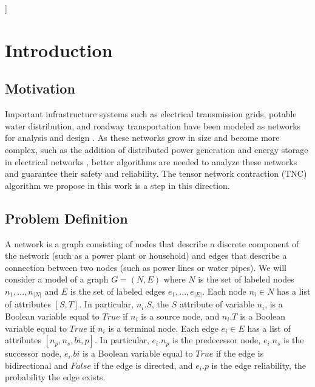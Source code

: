 \documentclass[12pt,twocolumn]{article}
\newcommand{\seven}{\fontsize{7pt}{\baselineskip}\selectfont}    %
\begin{document}
\vspace*{20pt}
]



\BeforeBeginEnvironment{tabularx}{\begin{center}\seven}

\addtolength{\textfloatsep}{-0.2in}
\hypertarget{introduction}{%
\section{Introduction}\label{introduction}}

\hypertarget{motivation}{%
\subsection{Motivation}\label{motivation}}

Important infrastructure systems such as electrical transmission grids, potable water distribution, and roadway transportation have been modeled as networks for analysis and design \cite{levy1967monte} \cite{cotilla2012comparing}. As these networks grow in size and become more complex, such as the addition of distributed power generation and energy storage in electrical networks \cite{escalera2018survey}, better algorithms are needed to analyze these networks and guarantee their safety and reliability. The tensor network contraction (TNC) algorithm we propose in this work is a step in this direction.

\hypertarget{problem-definition}{%
\subsection{Problem Definition}\label{problem-definition}}

A network is a graph consisting of nodes that describe a discrete component of the network (such as a power plant or household) and edges that describe a connection between two nodes (such as power lines or water pipes). We will consider a model of a graph \(G = (N,E)\) where \(N\) is the set of labeled nodes \(n_1,...,n_{|N|}\) and \(E\) is the set of labeled edges \(e_1,...,e_{|E|}\). Each node \(n_i \in N\) has a list of attributes \([S,T]\). In particular, \(n_i.S\), the \(S\) attribute of variable \(n_i\), is a Boolean variable equal to \(True\) if \(n_i\) is a source node, and \(n_i.T\) is a Boolean variable equal to \(True\) if \(n_i\) is a terminal node. Each edge \(e_i \in E\) has a list of attributes \([n_p,n_s,bi,p]\). In particular, \(e_i.n_p\) is the predecessor node, \(e_i.n_s\) is the successor node, \(e_i.bi\) is a Boolean variable equal to \(True\) if the edge is bidirectional and \(False\) if the edge is directed, and \(e_i.p\) is the edge reliability, the probability the edge exists.
\end{document}
